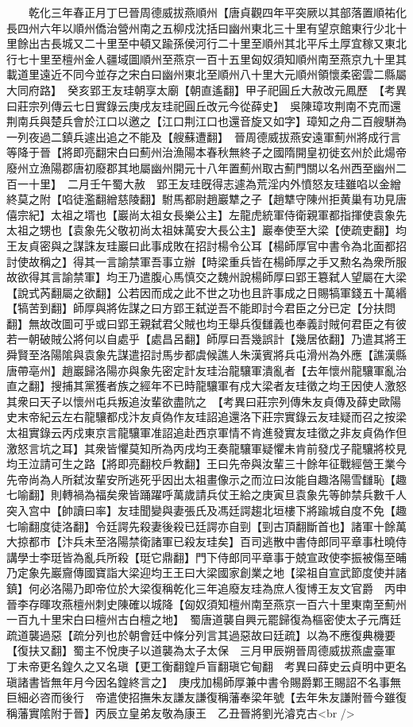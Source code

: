 　　乾化三年春正月丁巳晉周德威拔燕順州【唐貞觀四年平突厥以其部落置順祐化長四州六年以順州僑治營州南之五柳戍沈括曰幽州東北三十里有望京館東行少北十里餘出古長城又二十里至中頓又踰孫侯河行二十里至順州其北平斥土厚宜稼又東北行七十里至檀州金人疆域圖順州至燕京一百十五里匈奴須知順州南至燕京九十里其載道里遠近不同今並存之宋白曰幽州東北至順州八十里大元順州領懷柔密雲二縣屬大同府路】　癸亥郢王友珪朝享太廟【朝直遙翻】甲子祀圓丘大赦改元鳳歷　【考異曰莊宗列傳云七日實錄云庚戌友珪祀圓丘改元今從薛史】　吳陳璋攻荆南不克而還荆南兵與楚兵會於江口以邀之【江口荆江口也還音旋又如字】璋知之舟二百艘駢為一列夜過二鎮兵遽出追之不能及【艘蘇遭翻】　晉周德威拔燕安遠軍薊州將成行言等降于晉【將即亮翻宋白曰薊州治漁陽本春秋無終子之國隋開皇初徙玄州於此煬帝廢州立漁陽郡唐初廢郡其地屬幽州開元十八年置薊州取古薊門關以名州西至幽州二百一十里】　二月壬午蜀大赦　郢王友珪旣得志遽為荒淫内外憤怒友珪雖啗以金繒終莫之附【啗徒濫翻繒慈陵翻】駙馬都尉趙巖犨之子【趙犨守陳州拒黄巢有功見唐僖宗紀】太祖之壻也【巖尚太祖女長樂公主】左龍虎統軍侍衛親軍都指揮使袁象先太祖之甥也【袁象先父敬初尚太祖妹萬安大長公主】巖奉使至大梁【使疏吏翻】均王友貞密與之謀誅友珪巖曰此事成敗在招討楊令公耳【楊師厚官中書令為北面都招討使故稱之】得其一言諭禁軍吾事立辦【時梁重兵皆在楊師厚之手又勲名為衆所服故欲得其言諭禁軍】均王乃遣腹心馬慎交之魏州說楊師厚曰郢王簒弑人望屬在大梁【說式芮翻屬之欲翻】公若因而成之此不世之功也且許事成之日賜犒軍錢五十萬緡【犒苦到翻】師厚與將佐謀之曰方郢王弑逆吾不能即討今君臣之分已定【分扶問翻】無故改圖可乎或曰郢王親弑君父賊也均王舉兵復讎義也奉義討賊何君臣之有彼若一朝破賊公將何以自處乎【處昌呂翻】師厚曰吾幾誤計【幾居依翻】乃遣其將王舜賢至洛陽隂與袁象先謀遣招討馬步都虞候譙人朱漢賓將兵屯滑州為外應【譙漢縣唐帶亳州】趙巖歸洛陽亦與象先密定計友珪治龍驤軍潰亂者【去年懷州龍驤軍亂治直之翻】搜捕其黨獲者族之經年不已時龍驤軍有戍大梁者友珪徵之均王因使人激怒其衆曰天子以懷州屯兵叛追汝輩欲盡阬之　【考異曰莊宗列傳朱友貞傳及薛史歐陽史末帝紀云左右龍驤都戍汴友貞偽作友珪詔追還洛下莊宗實錄云友珪疑而召之按梁太祖實錄云丙戍東京言龍驤軍准詔追赴西京軍情不肯進發實友珪徵之非友貞偽作但激怒言坑之耳】其衆皆懼莫知所為丙戌均王奏龍驤軍疑懼未肯前發戊子龍驤將校見均王泣請可生之路【將即亮翻校戶教翻】王曰先帝與汝輩三十餘年征戰經營王業今先帝尚為人所弑汝輩安所逃死乎因出太祖畫像示之而泣曰汝能自趣洛陽雪讎恥【趣七喻翻】則轉禍為福矣衆皆踊躍呼萬歲請兵仗王給之庚寅旦袁象先等帥禁兵數千人突入宫中【帥讀曰率】友珪聞變與妻張氏及馮廷諤趨北垣樓下將踰城自度不免【趣七喻翻度徒洛翻】令廷諤先殺妻後殺已廷諤亦自剄【剄古頂翻斷首也】諸軍十餘萬大掠都市【汴兵未至洛陽禁衛諸軍已殺友珪矣】百司逃散中書侍郎同平章事杜曉侍講學士李珽皆為亂兵所殺【珽它鼎翻】門下侍郎同平章事于兢宣政使李振被傷至晡乃定象先巖齎傳國寶詣大梁迎均王王曰大梁國家創業之地【梁祖自宣武節度使并諸鎮】何必洛陽乃即帝位於大梁復稱乾化三年追廢友珪為庶人復博王友文官爵　丙申晉李存暉攻燕檀州刺史陳確以城降【匈奴須知檀州南至燕京一百六十里東南至薊州一百九十里宋白曰檀州古白檀之地】　蜀唐道襲自興元罷歸復為樞密使太子元膺廷疏道襲過惡【疏分列也於朝會廷中條分列言其過惡故曰廷疏】以為不應復典機要【復扶又翻】蜀主不悅庚子以道襲為太子太保　三月甲辰朔晉周德威拔燕盧臺軍　丁未帝更名鍠久之又名瑱【更工衡翻鍠戶盲翻瑱它甸翻　考異曰薛史云貞明中更名瑱諸書皆無年月今因名鍠終言之】　庚戌加楊師厚兼中書令賜爵鄴王賜詔不名事無巨細必咨而後行　帝遣使招撫朱友謙友謙復稱藩奉梁年號【去年朱友謙附晉今雖復稱藩實隂附于晉】丙辰立皇弟友敬為康王　乙丑晉將劉光濬克古<br />
